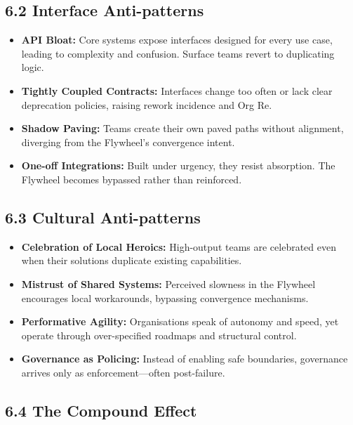 \documentclass[12pt]{article}
\begin{document}
\subsection*{6.2 Interface Anti-patterns}

\begin{itemize}
    \item \textbf{API Bloat:} Core systems expose interfaces designed for every use case, leading to complexity and confusion. Surface teams revert to duplicating logic.
    
    \item \textbf{Tightly Coupled Contracts:} Interfaces change too often or lack clear deprecation policies, raising rework incidence and Org Re.
    
    \item \textbf{Shadow Paving:} Teams create their own paved paths without alignment, diverging from the Flywheel’s convergence intent.
    
    \item \textbf{One-off Integrations:} Built under urgency, they resist absorption. The Flywheel becomes bypassed rather than reinforced.
\end{itemize}

\subsection*{6.3 Cultural Anti-patterns}

\begin{itemize}
    \item \textbf{Celebration of Local Heroics:} High-output teams are celebrated even when their solutions duplicate existing capabilities.
    
    \item \textbf{Mistrust of Shared Systems:} Perceived slowness in the Flywheel encourages local workarounds, bypassing convergence mechanisms.
    
    \item \textbf{Performative Agility:} Organisations speak of autonomy and speed, yet operate through over-specified roadmaps and structural control.
    
    \item \textbf{Governance as Policing:} Instead of enabling safe boundaries, governance arrives only as enforcement---often post-failure.
\end{itemize}

\subsection*{6.4 The Compound Effect}
\end{document}
